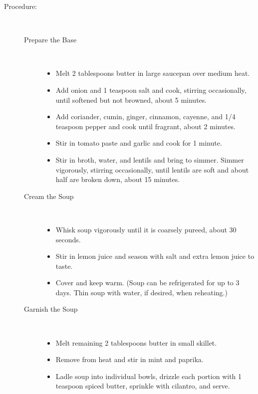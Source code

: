 \documentclass [11pt, letterpaper] {article}
\begin{document}
\begin{description}
\item[Procedure:]\ \\
	\begin{description}
	\item[Prepare the Base]\ \\
		\begin{itemize}
			\item	Melt 2 tablespoons butter in large saucepan over medium heat. 
			\item Add onion and 1 teaspoon salt and cook, stirring occasionally, until softened but not browned, about 5 minutes.
			\item Add coriander, cumin, ginger, cinnamon, cayenne, and 1/4 teaspoon pepper and cook until fragrant, about 2 minutes. 
			\item Stir in tomato paste and garlic and cook for 1 minute. 
			\item Stir in broth, water, and lentils and bring to simmer. Simmer vigorously, stirring occasionally, until lentils are soft and about half are broken down, about 15 minutes.
		\end{itemize}
	\item[Cream the Soup]\ \\
		\begin{itemize}
			\item Whisk soup vigorously until it is coarsely pureed, about 30 seconds. 
			\item Stir in lemon juice and season with salt and extra lemon juice to taste. 
			\item Cover and keep warm. (Soup can be refrigerated for up to 3 days. Thin soup with water, if desired, when reheating.)
		\end{itemize}
	\item[Garnish the Soup]\ \\
		\begin{itemize}
			\item Melt remaining 2 tablespoons butter in small skillet. 
			\item Remove from heat and stir in mint and paprika. 
			\item Ladle soup into individual bowls, drizzle each portion with 1 teaspoon spiced butter, sprinkle with cilantro, and serve.
		\end{itemize}
	\end{description}
\end{description}
\end{document}
